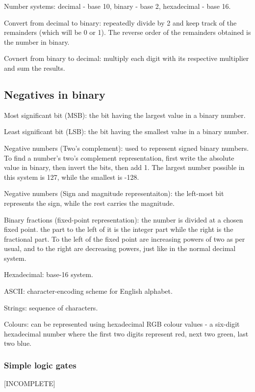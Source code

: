 \documentclass{article}
\begin{document}
Number systems: decimal - base 10, binary - base 2, hexadecimal - base 16.

Convert from decimal to binary: repeatedly divide by 2 and keep track of the
remainders (which will be 0 or 1). The reverse order of the remainders obtained
is the number in binary.

Covnert from binary to decimal: multiply each digit with its respective
multiplier and sum the results.

\subsection{Negatives in binary}
Most significant bit (MSB): the bit having the largest value in a binary
number.

Least significant bit (LSB): the bit having the smallest value in a binary
number.

Negative numbers (Two's complement): used to represent signed binary numbers.
To find a number's two's complement representation, first write the absolute
value in binary, then invert the bits, then add 1. The largest number possible
in this system is 127, while the smallest is -128.

Negative numbers (Sign and magnitude representaiton): the left-most bit
represents the sign, while the rest carries the magnitude.

Binary fractions (fixed-point representation): the number is divided at a
chosen fixed point. the part to the left of it is the integer part while the
right is the fractional part. To the left of the fixed point are increasing
powers of two as per usual, and to the right are decreasing powers, just like
in the normal decimal system.

Hexadecimal: base-16 system.

ASCII: character-encoding scheme for English alphabet.

Strings: sequence of characters.

Colours: can be represented using hexadecimal RGB colour values - a six-digit
hexadecimal number where the first two digits represent red, next two green,
last two blue.

\subsubsection{Simple logic gates}
[INCOMPLETE]
\end{document}
